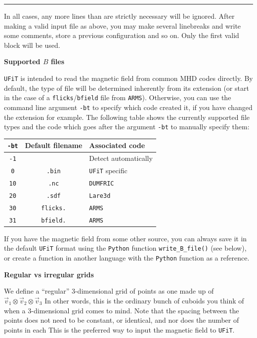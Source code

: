 \documentclass[12pt,twoside]{article}
\begin{document}
\noindent\rule{\linewidth}{0.4pt}

\vspace{2mm}

In all cases, any more lines than are strictly necessary will be ignored. After making a valid input file as above, you may make several linebreaks and write some comments, store a previous configuration and so on. Only the first valid block will be used.

\vspace{2mm}
{\Large \textbf{Supported $B$ files}}

\texttt{UFiT} is intended to read the magnetic field from common MHD codes directly. By default, the type of file will be determined inherently from its extension (or start in the case of a \texttt{flicks}/\texttt{bfield} file from \texttt{ARMS}). Otherwise, you can use the command line argument \texttt{-bt} to specify which code created it, if you have changed the extension for example. The following table shows the currently supported file types and the code which goes after the argument \texttt{-bt} to manually specify them:

\vspace{2mm}
\begin{tabular}{|c|c|l|}		
		\hline
		\texttt{-bt} & \textbf{Default filename} & \textbf{Associated code} \\\hline\hline
		\texttt{-1} &  & Detect automatically \\\hline
		\texttt{0}  &  \texttt{.bin} & \texttt{UFiT} specific \\\hline
		\texttt{10} & \texttt{.nc} & \texttt{DUMFRIC} \\\hline
		\texttt{20} & \texttt{.sdf} & \texttt{Lare3d} \\\hline
		\texttt{30} & \texttt{flicks.} & \texttt{ARMS} \\\hline
		\texttt{31} & \texttt{bfield.} & \texttt{ARMS} \\\hline
\end{tabular}
\vspace{2mm}

If you have the magnetic field from some other source, you can always save it in the default \texttt{UFiT} format using the \texttt{Python} function \texttt{write\_B\_file()} (see below), or create a function in another language with the \texttt{Python} function as a reference.

{\large \textbf{Regular vs irregular grids}}

We define a ``regular'' 3-dimensional grid of points as one made up of 
 $\vec{v}_1 \otimes \vec{v}_2 \otimes \vec{v}_3$
In other words, this is the ordinary bunch of cuboids you think of when a 3-dimensional grid comes to mind. Note that the spacing between the points does not need to be constant, or identical, and nor does the number of points in each 
This is the preferred way to input the magnetic field to \texttt{UFiT}.
\end{document}
